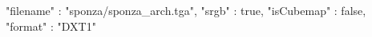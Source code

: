 { 
	"filename" : "sponza/sponza_arch.tga", 
	"srgb" : true,
	"isCubemap" : false,
	"format" : "DXT1"
}